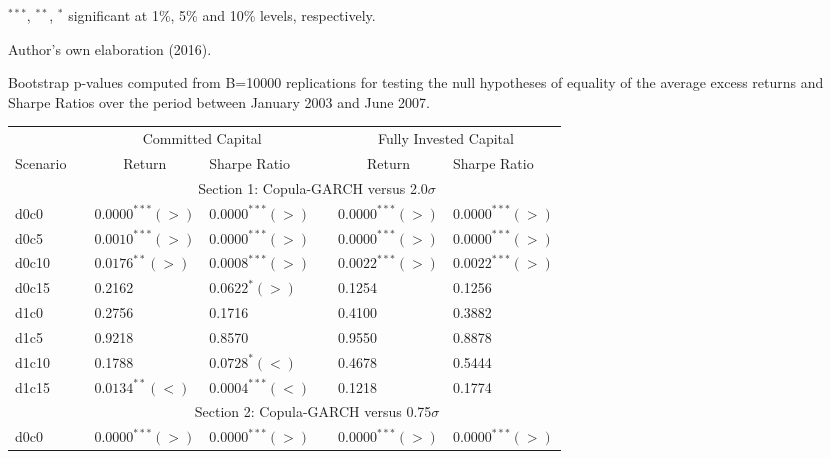 \documentclass[a4paper,12pt]{report}
\begin{document}
\begin{threeparttable}[H]
\begin{tablenotes}
		\item \scriptsize $^{\ast\ast\ast}$, $^{\ast\ast}$, $^{\ast}$ significant at 1\%, 5\% and 10\% levels, respectively.
		\item Author's own elaboration (2016).
	\end{tablenotes}
	\label{tab:table206}%
\end{threeparttable}%

\vspace{1.0cm}

\begin{threeparttable}[H]
	\centering \scriptsize
	\caption{Bootstrap p-values computed from B=10000 replications for testing the null hypotheses of equality of the average excess returns and Sharpe Ratios over the period between January 2003 and June 2007.}
	\begin{tabularx}{\textwidth}{@{\extracolsep{\fill}}lllllll@{}}
		\toprule
		& & \multicolumn{2}{c}{Committed Capital} & \multicolumn{1}{c}{} & \multicolumn{2}{c}{Fully Invested Capital} \\
		\cmidrule{3-4}  \cmidrule{6-7}
		\multicolumn{1}{c}{Scenario} & & \multicolumn{1}{c}{Return} & Sharpe Ratio &       & \multicolumn{1}{c}{Return}& Sharpe Ratio \\
		\midrule
		& \multicolumn{6}{c}{Section 1: Copula-GARCH versus 2.0$\sigma$} \\
		\midrule
		d0c0 & & $0.0000^{***}(>)$ & $0.0000^{***}(>)$ &       & $0.0000^{***}(>)$ & $0.0000^{***}(>)$ \\
		d0c5 & & $0.0010^{***}(>)$ & $0.0000^{***}(>)$ &       & $0.0000^{***}(>)$ & $0.0000^{***}(>)$   \\
		d0c10 & & $0.0176^{**}(>)$ & $0.0008^{***}(>)$ &       & $0.0022^{***}(>)$ & $0.0022^{***}(>)$ \\
		d0c15 & & 0.2162 & $0.0622^{*}(>)$ &       & 0.1254 & 0.1256 \\
		d1c0 & & 0.2756 & 0.1716  &       & 0.4100 & 0.3882 \\
		d1c5 & & 0.9218 & 0.8570 &       & 0.9550 & 0.8878 \\
		d1c10 & & 0.1788 & $0.0728^{*}(<)$ &       & 0.4678 & 0.5444 \\
		d1c15 & & $0.0134^{**}(<)$ & $0.0004^{***}(<)$ &       & 0.1218 & 0.1774 \\
		\midrule
		& \multicolumn{6}{c}{Section 2: Copula-GARCH versus 0.75$\sigma$} \\
		\midrule
		d0c0 & & $0.0000^{***}(>)$ & $0.0000^{***}(>)$ &       & $0.0000^{***}(>)$ & $0.0000^{***}(>)$ \\

\end{tabularx}
\end{threeparttable}
\end{document}
